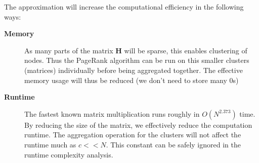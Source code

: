 \documentclass[]{article}
\begin{document}
The approximation will increase the computational efficiency in the following ways:
\begin{description}
	\item[\textbf{Memory}] As many parts of the matrix $\mathbf{H}$ will be sparse, this enables clustering of nodes.
	Thus the PageRank algorithm can be run on this smaller clusters (matrices) individually before being aggregated together. The effective memory usage will thus be reduced (we don't need to store many 0s)
	\item[\textbf{Runtime}] The fastest known matrix multiplication runs roughly in $O(N^{2.373})$ time. By reducing the size of the matrix, we effectively reduce the computation runtime. The aggregation operation for the clusters will not affect the runtime much as $c << N$. This constant can be safely ignored in the runtime complexity analysis.
\end{description}
\end{document}
